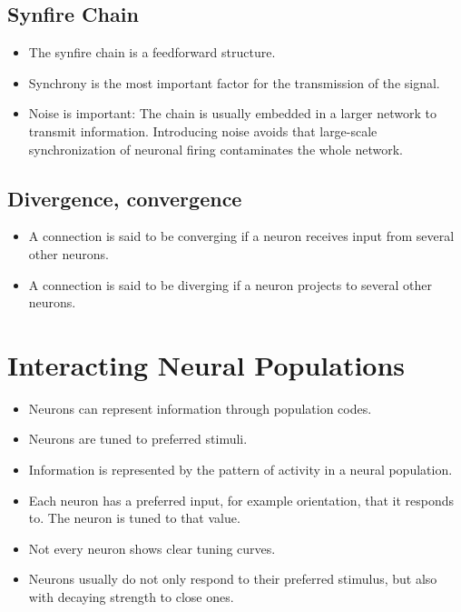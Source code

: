 \documentclass[a4paper, 12pt]{article}
\begin{document}
\subsection{Synfire Chain}
\begin{itemize}[noitemsep,nolistsep]
	\item The synfire chain is a feedforward structure.
	\item Synchrony is the most important factor for the transmission of the signal.
	\item Noise is important: The chain is usually embedded in a larger network to transmit information. Introducing noise avoids that large-scale synchronization of neuronal firing contaminates the whole network.
\end{itemize}

\subsection{Divergence, convergence}
\begin{itemize}[noitemsep,nolistsep]
	\item A connection is said to be converging if a neuron receives input from several other neurons.
	\item A connection is said to be diverging if a neuron projects to several other neurons.
\end{itemize}

\section{Interacting Neural Populations}
\begin{itemize}[noitemsep,nolistsep]
	\item Neurons can represent information through population codes.
	\item Neurons are tuned to preferred stimuli.
	\item Information is represented by the pattern of activity in a neural population.
	\item Each neuron has a preferred input, for example orientation, that it responds to. The neuron is tuned to that value.
	\item Not every neuron shows clear tuning curves.
	\item Neurons usually do not only respond to their preferred stimulus, but also with decaying strength to close ones.
\end{itemize}
\end{document}
